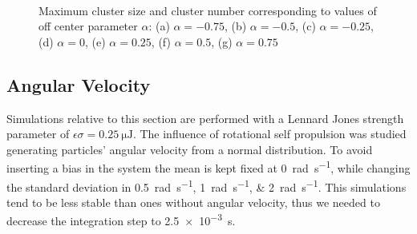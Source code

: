 \documentclass[../../master_thesis_np.tex]{subfiles}
\begin{document}
		\begin{figure}\ContinuedFloat
			\centering
			\\
			
			\caption{Maximum cluster size and cluster number corresponding to values of off center parameter $\alpha$: (a) $\alpha = -0.75$, (b) $\alpha = -0.5$, (c) $\alpha = -0.25$, (d) $\alpha = 0$, (e) $\alpha = 0.25$, (f) $\alpha = 0.5$, (g) $\alpha = 0.75$}
			\label{fig:lj_oc_clust}
		\end{figure}
	
		
		\subsection{Angular Velocity}
		Simulations relative to this section are performed with a Lennard Jones strength parameter of $\epsilon \sigma = \SI{0.25}{\micro\joule}$.
		The influence of rotational self propulsion was studied generating particles' angular velocity from a normal distribution.
		To avoid inserting a bias in the system the mean is kept fixed at \SI{0}{\radian\per\second}, while changing the standard deviation in \qtylist{0.5; 1;2}{\radian\per\second}.
		This simulations tend to be less stable than ones without angular velocity, thus we needed to decrease the integration step to \SI{2.5 e-3}{\second}.
		
\end{document}

